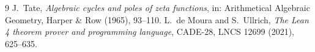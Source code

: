 \documentclass[11pt]{amsart}
\theoremstyle{definition}
\theoremstyle{remark}
\begin{document}
\begin{thebibliography}{9}
 J.~Tate, \emph{Algebraic cycles and poles of zeta functions}, in: Arithmetical Algebraic Geometry, Harper \& Row (1965), 93--110.
 L.~de Moura and S.~Ullrich, \emph{The Lean 4 theorem prover and programming language}, CADE-28, LNCS 12699 (2021), 625--635.
\end{thebibliography}
\end{document}
